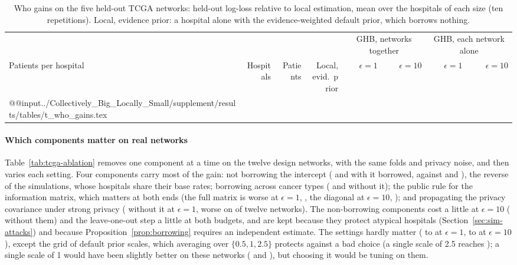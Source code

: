 \begin{table}[t]
\caption{Who gains on the five held-out TCGA networks: held-out log-loss relative to local estimation, mean over the hospitals of each size (ten repetitions). Local, evidence prior: a hospital alone with the evidence-weighted default prior, which borrows nothing.}
\label{tab:who-gains}
\scriptsize
\begin{tabular}{@{}lrrrrrrr@{}}
\toprule
 & & & & \multicolumn{2}{c}{GHB, networks together} & \multicolumn{2}{c}{GHB, each network alone}\\
\cmidrule(lr){5-6}\cmidrule(l){7-8}
Patients per hospital & Hospitals & Patients & \makecell[r]{Local,\\evid.\ prior} & $\epsilon=1$ & $\epsilon=10$ & $\epsilon=1$ & $\epsilon=10$\\
\midrule
\csname @@input\endcsname../Collectively_Big_Locally_Small/supplement/results/tables/t_who_gains.tex 
\bottomrule
\end{tabular}
\end{table}

\paragraph{Which components matter on real networks} Table~\ref{tab:tcga-ablation} removes one component at a time on the twelve design networks, with the same folds and privacy noise, and then varies each setting. Four components carry most of the gain: not borrowing the intercept (\SimAblOneInt{} and \SimAblTenInt{} with it borrowed, against \SimAblOneGHB{} and \SimAblTenGHB), the reverse of the simulations, whose hospitals share their base rates; borrowing across cancer types (\SimAblOnePan{} and \SimAblTenPan{} without it); the public rule for the information matrix, which matters at both ends (the full matrix is worse at $\epsilon=1$, \SimAblOneFull, the diagonal at $\epsilon=10$, \SimAblTenDiag); and propagating the privacy covariance under strong privacy (\SimAblOneVdp{} without it at $\epsilon=1$, worse on \SimAblOneVdpWins{} of twelve networks). The non-borrowing components cost a little at $\epsilon=10$ (\SimAblTenSafety{} without them) and the leave-one-out step a little at both budgets, and are kept because they protect atypical hospitals (Section~\ref{sec:sim-attacks}) and because Proposition~\ref{prop:borrowing} requires an independent estimate. The settings hardly matter (\SimSensOneMin{} to \SimSensOneMax{} at $\epsilon=1$, \SimSensTenMin{} to \SimSensTenMax{} at $\epsilon=10$), except the grid of default prior scales, which averaging over $\{0.5,1,2.5\}$ protects against a bad choice (a single scale of 2.5 reaches \SimSensOneScalesWide); a single scale of 1 would have been slightly better on these networks (\SimSensOneScalesOne{} and \SimSensTenScalesOne), but choosing it would be tuning on them.

